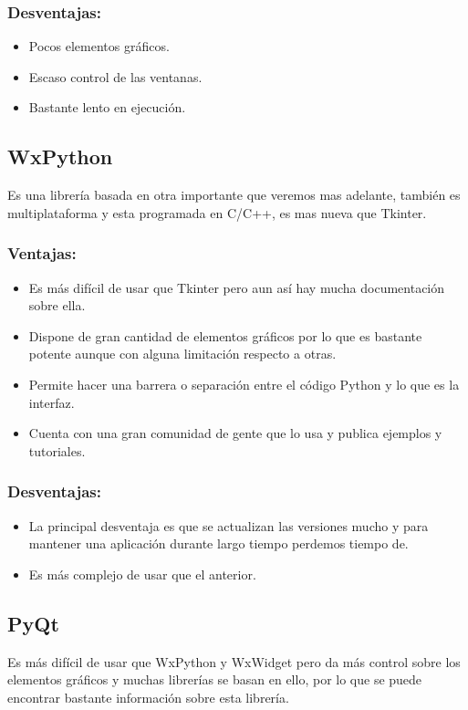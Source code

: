 \subsubsection{Desventajas:}
\begin{itemize}
\item Pocos elementos gráficos.
\item Escaso control de las ventanas.
\item Bastante lento en ejecución.
\end{itemize}

\subsection{WxPython}
Es una librería basada en otra importante que veremos mas adelante, también es multiplataforma y esta programada en C/C++, es mas nueva que Tkinter.
\subsubsection{Ventajas:}
\begin{itemize}
\item Es más difícil de usar que Tkinter pero aun así hay mucha documentación sobre ella.

\item Dispone de gran cantidad de elementos gráficos por lo que es bastante potente aunque con alguna limitación respecto a otras.

\item Permite hacer una barrera o separación entre el código Python y lo que es la interfaz.
\item Cuenta con una gran comunidad de gente que lo usa y publica ejemplos y tutoriales.
\end{itemize}

\subsubsection{Desventajas:}
\begin{itemize}
\item La principal desventaja es que se actualizan las versiones mucho y para mantener una aplicación durante largo tiempo perdemos tiempo de.
\item Es más complejo de usar que el anterior.
\end{itemize}

\subsection{PyQt}
Es más difícil de usar que WxPython y WxWidget pero da más control sobre los elementos gráficos y muchas librerías se basan en ello, por lo que se puede encontrar bastante información sobre esta librería.


